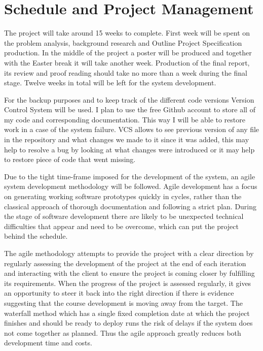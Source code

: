 \section{Schedule and Project Management}
The project will take around 15 weeks to complete. First week will be spent on the problem analysis, background research and Outline Project Specification production. In the middle of the project a poster will be produced and together with the Easter break it will take another week. Production of the final report, its review and proof reading should take no more than a week during the final stage. Twelve weeks in total will be left for the system development. 

For the backup purposes and to keep track of the different code versions Version Control System will be used. I plan to use the free Github account to store all of my code and corresponding documentation. This way I will be able to restore work in a case of the system failure. VCS allows to see previous version of any file in the repository and what changes we made to it since it was added, this may help to resolve a bug by looking at what changes were introduced or it may help to restore piece of code that went missing.  

Due to the tight time-frame imposed for the development of the system, an agile system development methodology will be followed. Agile development has a focus on generating working software prototypes quickly in cycles, rather than the classical approach of thorough documentation and following a strict plan. During the stage of software development there are likely to be unexpected technical difficulties that appear and need to be overcome, which can put the project behind the schedule.

The agile methodology attempts to provide the project with a clear direction by regularly assessing the development of the project at the end of each iteration and interacting with the client to ensure the project is coming closer by fulfilling its requirements. When the progress of the project is assessed regularly, it gives an opportunity to steer it back into the right direction if there is evidence suggesting that the course development is moving away from the target. The waterfall method which has a single fixed completion date at which the project finishes and should be ready to deploy runs the risk of delays if the system does not come together as planned. Thus the agile approach greatly reduces both development time and costs\cite{AgileManifesto}.

